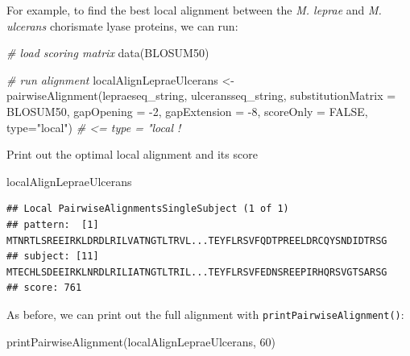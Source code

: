 \documentclass[
]{book}
\newenvironment{Shaded}{\begin{snugshade}}{\end{snugshade}}
\newcommand{\AttributeTok}[1]{\textcolor[rgb]{0.77,0.63,0.00}{#1}}
\newcommand{\CommentTok}[1]{\textcolor[rgb]{0.56,0.35,0.01}{\textit{#1}}}
\newcommand{\ConstantTok}[1]{\textcolor[rgb]{0.00,0.00,0.00}{#1}}
\newcommand{\DecValTok}[1]{\textcolor[rgb]{0.00,0.00,0.81}{#1}}
\newcommand{\FunctionTok}[1]{\textcolor[rgb]{0.00,0.00,0.00}{#1}}
\newcommand{\NormalTok}[1]{#1}
\newcommand{\OtherTok}[1]{\textcolor[rgb]{0.56,0.35,0.01}{#1}}
\newcommand{\SpecialCharTok}[1]{\textcolor[rgb]{0.00,0.00,0.00}{#1}}
\newcommand{\StringTok}[1]{\textcolor[rgb]{0.31,0.60,0.02}{#1}}
\begin{document}
For example, to find the best local alignment between the \emph{M. leprae} and \emph{M. ulcerans} chorismate lyase proteins, we can run:

\begin{Shaded}
\begin{Highlighting}[]
\CommentTok{\# load scoring matrix}
\FunctionTok{data}\NormalTok{(BLOSUM50)}

\CommentTok{\# run alignment}
\NormalTok{localAlignLepraeUlcerans }\OtherTok{\textless{}{-}} \FunctionTok{pairwiseAlignment}\NormalTok{(lepraeseq\_string, }
\NormalTok{                                              ulceransseq\_string,}
                                              \AttributeTok{substitutionMatrix =}\NormalTok{ BLOSUM50, }
                                              \AttributeTok{gapOpening =} \SpecialCharTok{{-}}\DecValTok{2}\NormalTok{, }
                                              \AttributeTok{gapExtension =} \SpecialCharTok{{-}}\DecValTok{8}\NormalTok{, }
                                              \AttributeTok{scoreOnly =} \ConstantTok{FALSE}\NormalTok{, }
                                              \AttributeTok{type=}\StringTok{"local"}\NormalTok{)  }\CommentTok{\# \textless{}= type = "local !}
\end{Highlighting}
\end{Shaded}

Print out the optimal local alignment and its score

\begin{Shaded}
\begin{Highlighting}[]
\NormalTok{localAlignLepraeUlcerans }
\end{Highlighting}
\end{Shaded}

\begin{verbatim}
## Local PairwiseAlignmentsSingleSubject (1 of 1)
## pattern:  [1] MTNRTLSREEIRKLDRDLRILVATNGTLTRVL...TEYFLRSVFQDTPREELDRCQYSNDIDTRSG
## subject: [11] MTECHLSDEEIRKLNRDLRILIATNGTLTRIL...TEYFLRSVFEDNSREEPIRHQRSVGTSARSG
## score: 761
\end{verbatim}

As before, we can print out the full alignment with \texttt{printPairwiseAlignment()}:

\begin{Shaded}
\begin{Highlighting}[]
\FunctionTok{printPairwiseAlignment}\NormalTok{(localAlignLepraeUlcerans, }\DecValTok{60}\NormalTok{)}
\end{Highlighting}
\end{Shaded}
\end{document}

